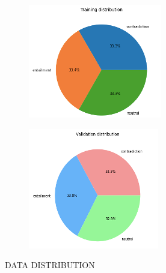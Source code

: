 \documentclass[runningheads]{llncs}
\begin{document}
\begin{figure}
	\begin{subfigure}{.5\textwidth}
		\centering
		\includegraphics[width=1\linewidth]{hist.png}  
		\label{fig:sub-first}
	\end{subfigure}
	\begin{subfigure}{.5\textwidth}
		\centering
		\includegraphics[width=1\linewidth]{hist1.png}  
		\label{fig:sub-second}
	\end{subfigure}
	\caption{DATA DISTRIBUTION}
	\label{fig:fig}
\end{figure}
\end{document}
